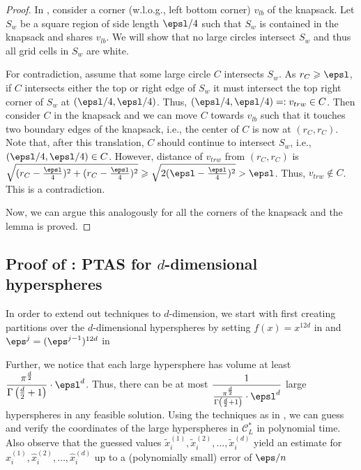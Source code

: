 \begin{proof}
	In , consider a corner (w.l.o.g., left bottom corner) $v_{lb}$ of the knapsack. Let  $S_w$ be a square region of side length $\epsl/4$ such that $S_w$ is contained in the knapsack and shares $v_{lb}$.
	We will show that no large circles intersect $S_w$ and thus all grid cells in $S_w$ are white.
	
	For contradiction, assume that some large circle $C$ intersects $S_w$. As $r_C \geqslant \epsl$, if $C$ intersects either the top or right edge of $S_w$ it must intersect the top right corner of $S_w$ at $(\epsl/4, \epsl/4)$.  Thus, $(\epsl/4, \epsl/4)=: v_{trw} \in C$. 
	Then consider $C$ in the knapsack and we can move $C$ towards $v_{lb}$  such that it touches two boundary edges of the knapsack, i.e.,  the center of $C$ is now at $(r_C, r_C)$. Note that, after this translation, $C$ should continue to intersect $S_w$, i.e.,  $(\epsl/4, \epsl/4) \in C$. 
	However, distance of $v_{trw}$ from $(r_C, r_C)$ is $\sqrt{(r_C-\frac{\epsl}{4})^2 + (r_C-\frac{\epsl}{4})^2} \geqslant \sqrt{2(\epsl-\frac{\epsl}{4})^2} > \epsl$.
	Thus,  $v_{trw} \notin C$. This is a contradiction. 
	
	Now, we can argue this analogously for all the corners of the knapsack and the lemma is proved. 
\end{proof}



\subsection{Proof of : \textsf{PTAS} for $d$-dimensional hyperspheres}

	In order to extend out techniques to \(d\)-dimension, we start with first creating partitions over the \(d\)-dimensional hyperspheres by setting \(f(x)=x^{12d}\) in  and \(\eps^{j}=(\eps^{j-1})^{12d}\) in  
	
	Further, we notice that each large hypersphere has volume at least \( \dfrac{\pi^{\frac{d}{2}}}{\Gamma\left(\frac{d}{2} + 1\right)} \cdot \epsl^d
	\). Thus, there can be at most \(\dfrac{1}{\frac{\pi^{\frac{d}{2}}}{\Gamma\left(\frac{d}{2} + 1\right)} \cdot \epsl^d}\) large hyperspheres in any feasible solution. Using the techniques as in , we can guess and verify the coordinates of the large hyperspheres in \(\mathcal{C}_{L}^*\) in polynomial time. Also observe that the guessed values $\tilde{x}_{i}^{(1)},\tilde{x}_{i}^{(2)},\dots,\tilde{x}_{i}^{(d)}$
	yield an estimate for $\hat{x}_{i}^{(1)},\hat{x}_{i}^{(2)},\dots,\hat{x}_{i}^{(d)}$ up to a (polynomially small) error of $\eps/n$
	
